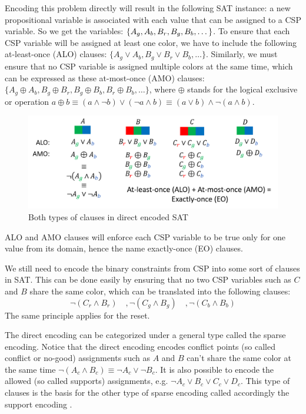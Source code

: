 Encoding this problem directly will result in the following SAT instance:
a new propositional variable is associated with each value that can be assigned to a CSP variable. So we get the variables: $\{ A_g, A_b, B_r, B_g,\\ B_b, \dots\}$. To ensure that each CSP variable will be assigned at least one color, we have to include the following at-least-once (ALO) clauses: $\{ A_g \vee A_b, B_g \vee B_r \vee B_b, \dots \}$. Similarly, we must ensure that no CSP variable is assigned multiple colors at the same time, which can be expressed as these at-most-once (AMO) clauses: $\{ A_g \oplus A_b, B_g \oplus B_r, B_g \oplus B_b, B_r \oplus B_b, \dots \} $, where $\oplus$ stands for the logical exclusive or operation $a \oplus b \equiv (a \wedge \neg b) \vee (\neg a \wedge b) \equiv (a \vee b) \wedge \neg (a \wedge b)$.
\begin{figure}[H]
	\centering
	\includegraphics[width=0.75\linewidth]{assets/alo_amo}
	\captionsetup{justification=centering,margin=2cm}
	\caption{Both types of clauses in direct encoded SAT}
	\label{fig:alo_amo}
\end{figure}  
ALO and AMO clauses will enforce each CSP variable to be true only for one value from its domain, hence the name exactly-once (EO) clauses.

We still need to encode the binary constraints from CSP into some sort of clauses in SAT. This can be done easily by ensuring that no two CSP variables such as $C$ and $B$ share the same color, which can be translated into the following clauses:
$$
	\neg (C_r \wedge B_r) \quad, \neg (C_g \wedge B_g) \quad, \neg (C_b \wedge B_b)
$$
The same principle applies for the reset.

The direct encoding can be categorized under a general type called the sparse encoding. Notice that the direct encoding encodes conflict points (so called conflict or no-good) assignments such as $A$ and $B$ can't share the same color at the same time $\neg (A_c \wedge B_c) \equiv \neg A_c \vee \neg B_c$. It is also possible to encode the allowed (so called supports) assignments, e.g. $\neg A_c \vee B_c \vee C_c \vee D_c$. This type of clauses is the basis for the other type of sparse encoding called accordingly the support encoding \cite{petke2011order}.

